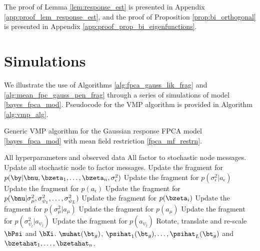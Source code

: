 \documentclass[ba]{imsart}
\numberwithin{equation}{section}
\theoremstyle{plain}
\def\sigsqeps{\sigma^2_{\epsilon}}
\def\aeps{a_{\epsilon}}
\def\sigsqmu{\sigma^2_{\mu}}
\def\amu{a_{\mu}}
\newcommand\sigsqpsi[1]{\sigma^2_{\psi_{#1}}}
\newcommand\apsi[1]{a_{\psi_{#1}}}
\begin{document}
\noindent The proof of Lemma \ref{lem:response_est} is presented in Appendix \ref{app:proof_lem_response_est},
and the proof of Proposition \ref{prop:bi_orthogonal} is presented in Appendix \ref{app:proof_prop_bi_eigenfunctions}.


\section{Simulations}
\label{sec:sims}

We illustrate the use of Algorithms \ref{alg:fpca_gauss_lik_frag} and \ref{alg:mean_fpc_gauss_pen_frag}
through a series of simulations of model \eqref{bayes_fpca_mod}. Pseudocode for the VMP algorithm is
provided in Algorithm \ref{alg:vmp_alg}.

\begin{algorithm}
	\caption{
		Generic VMP algorithm for the Gaussian response FPCA model \eqref{bayes_fpca_mod} with
		mean field restriction \eqref{fpca_mf_restrn}.
	}
	\label{alg:vmp_alg}
	\begin{algorithmic}[1]
		\Inputs All hyperparameters and observed data
		\Initialize All factor to stochastic node messages.
		\Updates
				\State Update all stochastic node to factor messages.
				\State Update the fragment for $p (\by | \bnu, \bzeta_1, \dots, \bzeta_n, \sigsqeps)$
				\State Update the fragment for $p (\sigsqeps | \aeps)$
				\State Update the fragment for $p (\aeps)$
				\State Update the fragment for $p (\bnu | \sigsqmu, \sigsqpsi{1}, \dots, \sigsqpsi{L})$
					\State Update the fragment for $p (\bzeta_i)$
				\EndFor
				\State Update the fragment for $p (\sigsqmu | \amu)$
				\State Update the fragment for $p (\amu)$
					\State Update the fragment for $p (\sigsqpsi{l} | \apsi{l})$
					\State Update the fragment for $p (\apsi{l})$
				\EndFor
			\EndWhile
			\State Rotate, translate and re-scale $\bPsi$ and $\bXi$.
		\Outputs $\muhat (\bt_g)$, $\psihat_1 (\bt_g), \dots, \psihat_L (\bt_g)$ and $\bzetahat_1, \dots, \bzetahat_n$.
	\end{algorithmic}
\end{algorithm}
\end{document}
